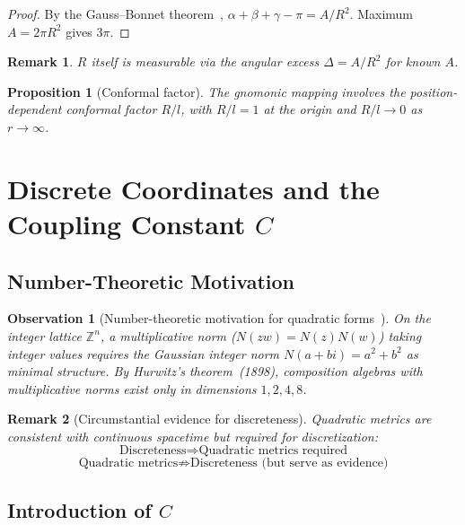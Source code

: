 \documentclass[12pt,a4paper]{article}
\newtheorem{proposition}[theorem]{Proposition}
\newtheorem*{remark}{Remark}
\newtheorem*{observation}{Observation}
\begin{document}
\begin{proof}
By the Gauss--Bonnet theorem~\cite{doCarmo1992}, $\alpha + \beta + \gamma - \pi = A/R^2$. Maximum $A = 2\pi R^2$ gives $3\pi$.
\end{proof}

\begin{remark}
$R$ itself is measurable via the angular excess $\Delta = A/R^2$ for known $A$.
\end{remark}

\begin{proposition}[Conformal factor]
The gnomonic mapping involves the position-dependent conformal factor $R/l$, with $R/l = 1$ at the origin and $R/l \to 0$ as $r \to \infty$.
\end{proposition}

\section{Discrete Coordinates and the Coupling Constant $C$}

\subsection{Number-Theoretic Motivation}

\begin{observation}[Number-theoretic motivation for quadratic forms~{\rm\cite{Hurwitz1898}}]
On the integer lattice $\mathbb{Z}^n$, a multiplicative norm ($N(zw) = N(z)N(w)$) taking integer values requires the Gaussian integer norm $N(a+bi) = a^2 + b^2$ as minimal structure. By Hurwitz's theorem~(1898), composition algebras with multiplicative norms exist only in dimensions $1, 2, 4, 8$.
\end{observation}

\begin{remark}[Circumstantial evidence for discreteness]
Quadratic metrics are consistent with continuous spacetime but \emph{required} for discretization:
\[
\text{Discreteness} \Longrightarrow \text{Quadratic metrics required}
\]
\[
\text{Quadratic metrics} \not\Longrightarrow \text{Discreteness (but serve as evidence)}
\]
\end{remark}

\subsection{Introduction of $C$}
\end{document}
